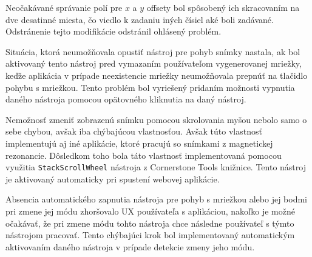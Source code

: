 Neočakávané správanie polí pre $x$ a $y$ offsety bol spôsobený ich skracovaním na dve desatinné miesta, čo viedlo k zadaniu iných čísiel aké boli zadávané. Odstránenie tejto modifikácie odstránil ohlásený problém.

Situácia, ktorá neumožňovala opustiť nástroj pre pohyb snímky nastala, ak bol aktivovaný tento nástroj pred vymazaním používateľom vygenerovanej mriežky, keďže aplikácia v prípade neexistencie mriežky neumožňovala prepnúť na tlačidlo pohybu s mriežkou. Tento problém bol vyriešený pridaním možnosti vypnutia daného nástroja pomocou opätovného kliknutia na daný nástroj.

Nemožnosť zmeniť zobrazenú snímku pomocou skrolovania myšou nebolo samo o sebe chybou, avšak iba chýbajúcou vlastnosťou. Avšak túto vlastnosť implementujú aj iné aplikácie, ktoré pracujú so snímkami z magnetickej rezonancie. Dôsledkom toho bola táto vlastnosť implementovaná pomocou využitia \texttt{StackScrollWheel} nástroja z Cornerstone Tools knižnice. Tento nástroj je aktivovaný automaticky pri spustení webovej aplikácie.

\clearpage

Absencia automatického zapnutia nástroja pre pohyb s mriežkou alebo jej bodmi pri zmene jej módu zhoršovalo UX používateľa s aplikáciou, nakoľko je možné očakávať, že pri zmene módu tohto nástroja chce následne používateľ s týmto nástrojom pracovať. Tento chýbajúci krok bol implementovaný automatickým aktivovaním daného nástroja v prípade detekcie zmeny jeho módu.